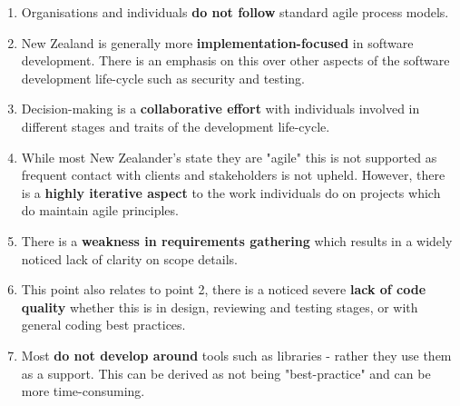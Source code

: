 \begin{enumerate}
\item Organisations and individuals \textbf{do not follow} standard agile process models.
\item New Zealand is generally more \textbf{implementation-focused} in software development. There is an emphasis on this over other aspects of the software development life-cycle such as security and testing. 
\item Decision-making is a \textbf{collaborative effort} with individuals involved in different stages and traits of the development life-cycle. 
\item While most New Zealander's state they are "agile" this is not supported as frequent contact with clients and stakeholders is not upheld. However, there is a \textbf{highly iterative aspect} to the work individuals do on projects which do maintain agile principles. 
\item There is a \textbf{weakness in requirements gathering} which results in a widely noticed lack of clarity on scope details. 
\item This point also relates to point 2, there is a noticed severe \textbf{lack of code quality} whether this is in design, reviewing and testing stages, or with general coding best practices. 
\item Most \textbf{do not develop around }tools such as libraries - rather they use them as a support. This can be derived as not being "best-practice" and can be more time-consuming. 
\end{enumerate}

